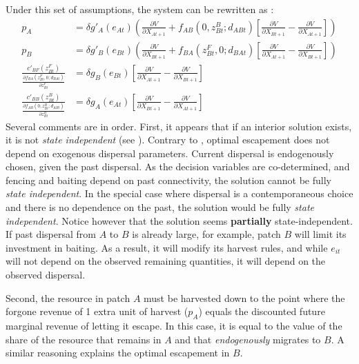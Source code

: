 \documentclass{article}
\begin{document}
Under this set of assumptions, the system can be rewritten as : 
\begin{align}
p_A &= \delta g'_A(e_{At}) \left(\frac{\partial V}{\partial X_{At+1}} + f_{AB}(0, z_{Bt}^B; d_{ABt})\left[\frac{\partial V}{\partial X_{Bt+1}} - \frac{\partial V}{\partial X_{At+1}}  \right] \right)\\
%
p_B &= \delta g'_B(e_{Bt}) \left(\frac{\partial V}{\partial X_{Bt+1}} + f_{BA}(z_{Bt}^F, 0; d_{BAt})\left[\frac{\partial V}{\partial X_{At+1}} - \frac{\partial V}{\partial X_{Bt+1}}  \right] \right)\\
%
\frac{c'_{BF}(z_{Bt}^F)}{\frac{\partial f_{BA}(z_{Bt}^F, 0; d_{BAt})}{\partial z_{Bt}^F}} &= \delta g_B(e_{Bt})\left[ \frac{\partial V}{\partial X_{At+1}} - \frac{\partial V}{\partial X_{Bt+1}} \right]\\
%
\frac{c'_{BB}(z_{Bt}^B)}{\frac{\partial f_{AB}(0, z_{Bt}^B; d_{ABt})}{\partial z_{Bt}^B}} &= \delta g_A(e_{At})\left[ \frac{\partial V}{\partial X_{Bt+1}} - \frac{\partial V}{\partial X_{At+1}} \right]
\end{align}
Several comments are in order. First, it appears that if an interior solution exists, it is not \textit{state independent} (see \cite{costello_optimal_2008}). Contrary to \cite{costello_optimal_2008}, optimal escapement does not depend on exogenous dispersal parameters. Current dispersal is endogenously chosen, given the past dispersal. As the decision variables are co-determined, and fencing and baiting depend on past connectivity, the solution cannot be fully \textit{ state independent}. In the special case where dispersal is a contemporaneous choice and there is no dependence on the past, the solution would be fully \textit{state independent}.
Notice however that the solution seems \textbf{partially} state-independent. 
 If past dispersal from $A$ to $B$ is already large, for example, patch $B$ will limit its investment in baiting. As a result, it will modify its harvest rules, and while $e_{it}$ will not depend on the observed remaining quantities, it will depend on the observed dispersal. 

Second, the resource in patch $A$ must be harvested down to the point where the forgone revenue of 1 extra unit of harvest ($p_A$) equals the discounted future marginal revenue of letting it escape. In this case, it is equal to the value of the share of the resource that remains in $A$ and that \textit{endogenously} migrates to $B$. A similar reasoning explains the optimal escapement in $B$. 
\end{document}
